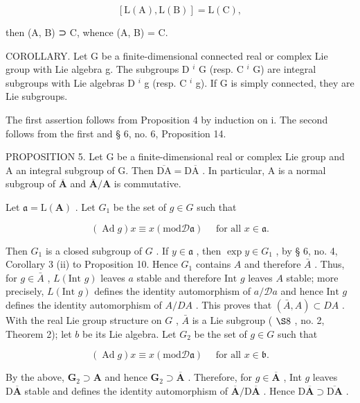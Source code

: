 \[
[ \mathrm{L} (\mathrm{A}), \mathrm{L} (\mathrm{B}) ] = \mathrm{L} (\mathrm{C}),
\]

then (A, B) ⊃ C, whence (A, B) = C.

COROLLARY. Let G be a finite-dimensional connected real or complex Lie group with Lie algebra g. The subgroups D \(^{i}\) G (resp. C \(^{i}\) G) are integral subgroups with Lie algebras D \(^{i}\) g (resp. C \(^{i}\) g). If G is simply connected, they are Lie subgroups.

The first assertion follows from Proposition 4 by induction on i. The second follows from the first and § 6, no. 6, Proposition 14.

PROPOSITION 5. Let G be a finite-dimensional real or complex Lie group and A an integral subgroup of G. Then \(\overline{\mathrm{D}\mathrm{A}} = \mathrm{D}\overline{\mathrm{A}}\) . In particular, A is a normal subgroup of \(\overline{\mathbf{A}}\) and \(\overline{\mathbf{A}} / \mathbf{A}\) is commutative.

Let \(\mathfrak{a} = \mathrm{L}(\mathbf{A})\) . Let \(G_{1}\) be the set of \(g \in G\) such that

\[
(\operatorname{Ad} g) x \equiv x (\mathrm{mod} \mathscr {D} \mathfrak {a}) \quad \text { for   all } x \in \mathfrak {a}.
\]

Then \(G_1\) is a closed subgroup of \(G\) . If \(y \in \mathfrak{a}\) , then \(\exp y \in G_1\) , by § 6, no. 4, Corollary 3 (ii) to Proposition 10. Hence \(G_1\) contains \(A\) and therefore \(\bar{A}\) . Thus, for \(g \in \bar{A}\) , \(L(\text{Int } g)\) leaves \(a\) stable and therefore \(\text{Int } g\) leaves \(A\) stable; more precisely, \(L(\text{Int } g)\) defines the identity automorphism of \(a / \mathcal{D}a\) and hence \(\text{Int } g\) defines the identity automorphism of \(A / DA\) . This proves that \((\bar{A}, A) \subset DA\) . With the real Lie group structure on \(G\) , \(\bar{A}\) is a Lie subgroup ( \(\S 8\) , no. 2, Theorem 2); let \(b\) be its Lie algebra. Let \(G_2\) be the set of \(g \in G\) such that

\[
(\operatorname{Ad} g) x \equiv x (\mathrm{mod} \mathscr {D} \mathfrak {a}) \quad \text { for   all } x \in \mathfrak {b}.
\]

By the above, \(\mathbf{G}_2\supset \mathbf{A}\) and hence \(\mathbf{G}_2\supset \overline{\mathbf{A}}\) . Therefore, for \(g\in \overline{\mathbf{A}}\) , Int \(g\) leaves \(\mathrm{D}\overline{\mathbf{A}}\) stable and defines the identity automorphism of \(\overline{\mathbf{A}} / \mathrm{D}\overline{\mathbf{A}}\) . Hence \(\mathrm{D}\overline{\mathbf{A}}\supset \overline{\mathrm{D}\mathbf{A}}\) .

